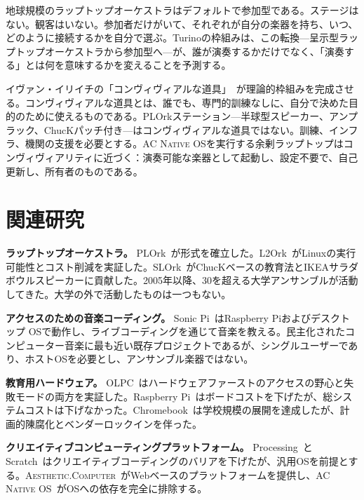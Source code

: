 \documentclass[10pt,letterpaper,twocolumn]{article}
\newcommand{\ac}{\textsc{Aesthetic.Computer}}
\newcommand{\acos}{\textsc{AC Native OS}}
\begin{document}
地球規模のラップトップオーケストラはデフォルトで参加型である。ステージはない。観客はいない。参加者だけがいて、それぞれが自分の楽器を持ち、いつ、どのように接続するかを自分で選ぶ。Turinoの枠組みは、この転換---呈示型ラップトップオーケストラから参加型へ---が、誰が演奏するかだけでなく、「演奏する」とは何を意味するかを変えることを予測する。

イヴァン・イリイチの「コンヴィヴィアルな道具」~\citep{illich1973tools}が理論的枠組みを完成させる。コンヴィヴィアルな道具とは、誰でも、専門的訓練なしに、自分で決めた目的のために使えるものである。PLOrkステーション---半球型スピーカー、アンプラック、ChucKパッチ付き---はコンヴィヴィアルな道具ではない。訓練、インフラ、機関の支援を必要とする。\acos{}を実行する余剰ラップトップはコンヴィヴィアリティに近づく：演奏可能な楽器として起動し、設定不要で、自己更新し、所有者のものである。


\section{関連研究}
\label{sec:related}

\textbf{ラップトップオーケストラ。} PLOrk~\citep{trueman2006plork}が形式を確立した。L2Ork~\citep{bukvic2010l2ork}がLinuxの実行可能性とコスト削減を実証した。SLOrk~\citep{wang2009designing}がChucKベースの教育法とIKEAサラダボウルスピーカーに貢献した。2005年以降、30を超える大学アンサンブルが活動してきた。大学の外で活動したものは一つもない。

\textbf{アクセスのための音楽コーディング。} Sonic Pi~\citep{aaron2016sonic}はRaspberry Piおよびデスクトップ OSで動作し、ライブコーディングを通じて音楽を教える。民主化されたコンピューター音楽に最も近い既存プロジェクトであるが、シングルユーザーであり、ホストOSを必要とし、アンサンブル楽器ではない。

\textbf{教育用ハードウェア。} OLPC~\citep{negroponte1995being, kraemer2009olpc}はハードウェアファーストのアクセスの野心と失敗モードの両方を実証した。Raspberry Pi~\citep{raspberry2012}はボードコストを下げたが、総システムコストは下げなかった。Chromebook~\citep{pirg2023chromebook}は学校規模の展開を達成したが、計画的陳腐化とベンダーロックインを伴った。

\textbf{クリエイティブコンピューティングプラットフォーム。} Processing~\citep{reas2007processing}とScratch~\citep{resnick2009scratch}はクリエイティブコーディングのバリアを下げたが、汎用OSを前提とする。\ac{}~\citep{scudder2026ac}がWebベースのプラットフォームを提供し、\acos{}~\citep{scudder2026os}がOSへの依存を完全に排除する。
\end{document}
